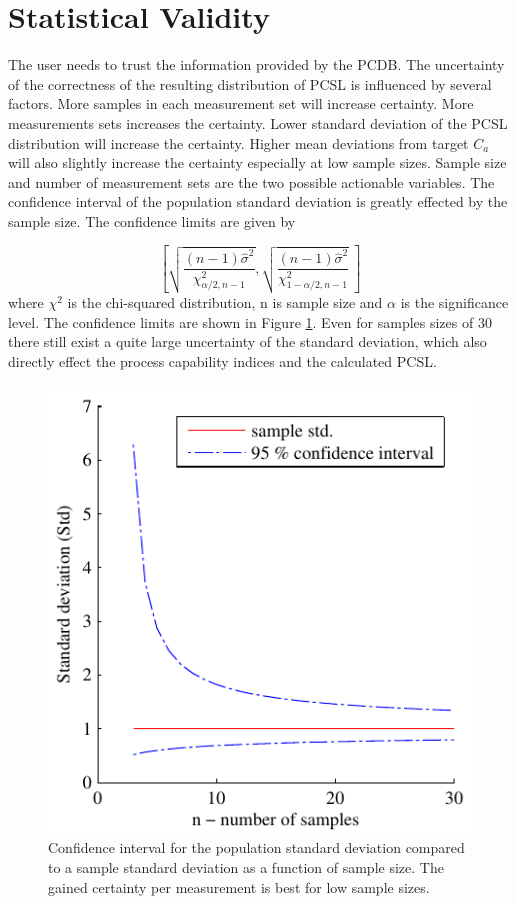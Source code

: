 \documentclass[aip,amsmath, reprint, author-year]{revtex4-1}
\begin{document}
\section{Statistical Validity}
The user needs to trust the information provided by the PCDB. The uncertainty of the correctness of the resulting distribution of PCSL is influenced by several factors. 
More samples in each measurement set will increase certainty. 
More measurements sets increases the certainty. 
Lower standard deviation of the PCSL distribution will increase the certainty.
Higher mean deviations from target $C_a$ will also slightly increase the certainty especially at low sample sizes.
Sample size and number of measurement sets are the two possible actionable variables. The confidence interval of the population standard deviation is greatly effected by the sample size.  The confidence limits are given by

\begin{equation}
\left[ \sqrt{\frac{(n-1) \hat{\sigma}^2 }{\chi^2_{\alpha/2,n-1}}},  \sqrt{\frac{(n-1) \hat{\sigma}^2 }{\chi^2_{1-\alpha/2,n-1}}} \  \right]
\end{equation}
where $\chi^2$ is the chi-squared distribution, n is sample size and $\alpha$ is the significance level. The confidence limits are shown in Figure \ref{fig:std_uncertainty}. Even for samples sizes of 30 there still exist a quite large uncertainty of the standard deviation, which also directly effect the process capability indices and the calculated PCSL. 

\begin{figure}
\includegraphics{stats_std_confidence.pdf}
\caption{\label{fig:std_uncertainty}Confidence interval for the population standard deviation compared to a sample standard deviation as a function of sample size. The gained certainty per measurement is best for low sample sizes.}
\end{figure}
\end{document}
